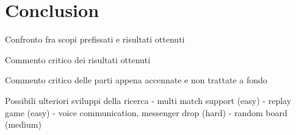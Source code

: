 \chapter{Conclusion}

	Confronto fra scopi prefissati e risultati ottenuti
	
	Commento critico dei risultati ottenuti
	
	Commento critico delle parti appena accennate e non trattate a fondo
	
	Possibili ulteriori sviluppi della ricerca
	- multi match support (easy)
	- replay game (easy)
	- voice communication, messenger drop (hard)
	- random board (medium)